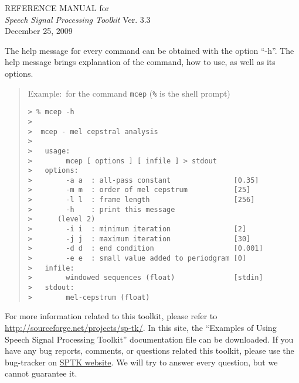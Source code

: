 \documentclass[12pt]{book}
\begin{document}


\begin{titlepage} 
\vspace*{\fill}
 \begin{center}
        \LARGE
        {\rm REFERENCE MANUAL for} \\
        {\sl Speech Signal Processing Toolkit} Ver. 3.3 \\[10mm]
        {\rm December 25, 2009}
 \end{center}
\vspace*{\fill}
\vspace*{\fill}

\newpage
\thispagestyle{empty}
\vspace*{\fill}
\noindent
The help message for every command can be obtained
with the option ``-h''.
The help message brings explanation of the command, how to use, 
as well as its options.

\begin{quote}
 Example:~for the command \verb!mcep! (\verb!%! is the shell prompt)
 \begin{verbatim}
> % mcep -h
> 
>  mcep - mel cepstral analysis
> 
>   usage:
>        mcep [ options ] [ infile ] > stdout
>   options:
>        -a a  : all-pass constant               [0.35]
>        -m m  : order of mel cepstrum           [25]
>        -l l  : frame length                    [256]
>        -h    : print this message
>      (level 2)
>        -i i  : minimum iteration               [2]
>        -j j  : maximum iteration               [30]
>        -d d  : end condition                   [0.001]
>        -e e  : small value added to periodgram [0]
>   infile:
>        windowed sequences (float)              [stdin]
>   stdout:
>        mel-cepstrum (float)
 \end{verbatim}
\end{quote}
\vspace{\baselineskip}
\noindent
For more information related to this toolkit,
please refer to
\href{http://sourceforge.net/projects/sp-tk/}{http://sourceforge.net/projects/sp-tk/}.
In this site, the
``Examples of Using Speech Signal Processing Toolkit''
documentation file can be downloaded.
If you have any bug reports, comments, or questions
related this toolkit, please use the bug-tracker on
\href{http://sourceforge.net/tracker/?group_id=176586}{SPTK website}.
We will try to answer every question, but we cannot guarantee it.
\end{titlepage}

\cleardoublepage
\pagestyle{headings}
\tableofcontents
\end{document}

